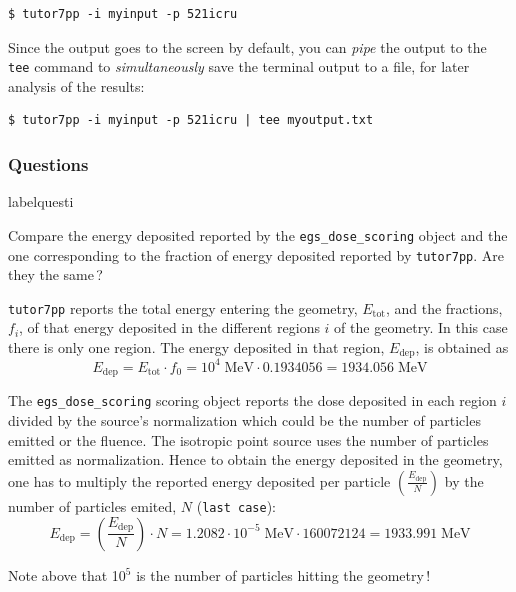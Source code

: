 \documentclass[12pt,twoside]{article}
\makeatletter
\renewcommand\thequesti         {\@arabic\c@questi}
\newenvironment{question}{
    \bfseries
    \edef\@questictr{questi}
    \expandafter
    \list \csname label\@questictr\endcsname {
        \usecounter\@questictr\def\makelabel##1{\hss\llap{##1}}
        \savebox{\questbox}             {\thequesti}
        \setlength\labelsep             {0.6em}
        \setlength\labelwidth           {\wd\questbox}
        \setlength\leftmargini          {\labelwidth}
        \addtolength{\leftmargini}      {\labelsep}
        \addtolength{\leftmargini}      {0.2em}
        \leftmargin\leftmargini
        \setlength\topsep               {1em}
        \setlength\itemsep              {1.2em}
        \setlength\parsep               {0.5em}
    }
}{\normalfont\endlist}
\newenvironment{answer}{\normalfont}{\relax}
\makeatother
\begin{document}
\begin{lstlisting}
$ tutor7pp -i myinput -p 521icru
\end{lstlisting}

Since the output goes to the screen by default, you can \textit{pipe} the output to the \Verb+tee+ command to \textit{simultaneously} save the terminal output to a file, for later analysis of the results:
\begin{lstlisting}
$ tutor7pp -i myinput -p 521icru | tee myoutput.txt
\end{lstlisting}

\subsubsection{Questions}

\begin{question}

\item Compare the energy deposited reported
by the \Verb+egs_dose_scoring+ object and the one corresponding to the fraction
of energy deposited reported by \Verb+tutor7pp+. Are they the same\,?

\begin{answer}
\Verb+tutor7pp+ reports the total energy entering the geometry,
$E_\mathrm{tot}$, and the fractions, $f_i$, of that energy deposited in the
different regions $i$ of the geometry. In this case there is only one region.
The energy deposited in that region, $E_\mathrm{dep}$, is obtained as
\begin{equation*}
 E_\mathrm{dep} = E_\mathrm{tot} \cdot f_0 = 10^4\; \mathrm{MeV} \cdot
0.1934056 = 1934.056\; \mathrm{MeV}
\end{equation*}

The \Verb+egs_dose_scoring+ scoring object reports the dose deposited in each
region $i$ divided by the source's normalization which could be the number of
particles emitted or the fluence. The isotropic point source uses the number of
particles emitted as normalization. Hence to obtain the energy deposited in the
geometry, one has to multiply the reported energy deposited per particle
$\left(\frac{E_\mathrm{dep}}{N}\right)$ by the number of particles emited, $N$
(\Verb+last case+):
\begin{equation*}
 E_\mathrm{dep} = \left(\frac{E_\mathrm{dep}}{N}\right) \cdot N = 1.2082 \cdot
10^{-5}\; \mathrm{MeV} \cdot
160072124 = 1933.991\; \mathrm{MeV}
\end{equation*}

Note above that 10$^5$ is the number of particles hitting the geometry\,!


\end{answer}
\end{question}
\end{document}
